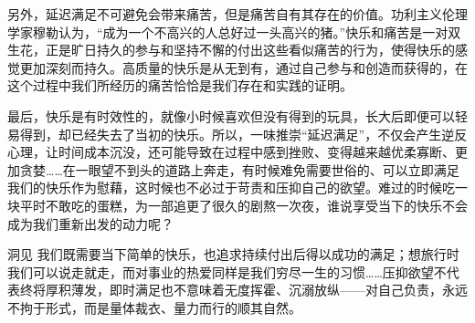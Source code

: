 另外，延迟满足不可避免会带来痛苦，但是痛苦自有其存在的价值。功利主义伦理学家穆勒认为，“成为一个不高兴的人总好过一头高兴的猪。”快乐和痛苦是一对双生花，正是旷日持久的参与和坚持不懈的付出这些看似痛苦的行为，使得快乐的感觉更加深刻而持久。高质量的快乐是从无到有，通过自己参与和创造而获得的，在这个过程中我们所经历的痛苦恰恰是我们存在和实践的证明。

最后，快乐是有时效性的，就像小时候喜欢但没有得到的玩具，长大后即便可以轻易得到，却已经失去了当初的快乐。所以，一味推崇“延迟满足”，不仅会产生逆反心理，让时间成本沉没，还可能导致在过程中感到挫败、变得越来越优柔寡断、更加贪婪……在一眼望不到头的道路上奔走，有时候难免需要世俗的、可以立即满足我们的快乐作为慰藉，这时候也不必过于苛责和压抑自己的欲望。难过的时候吃一块平时不敢吃的蛋糕，为一部追更了很久的剧熬一次夜，谁说享受当下的快乐不会成为我们重新出发的动力呢？

\begin{quoteBox}{洞见}
我们既需要当下简单的快乐，也追求持续付出后得以成功的满足；想旅行时我们可以说走就走，而对事业的热爱同样是我们穷尽一生的习惯……压抑欲望不代表终将厚积薄发，即时满足也不意味着无度挥霍、沉溺放纵——对自己负责，永远不拘于形式，而是量体裁衣、量力而行的顺其自然。
\end{quoteBox}
